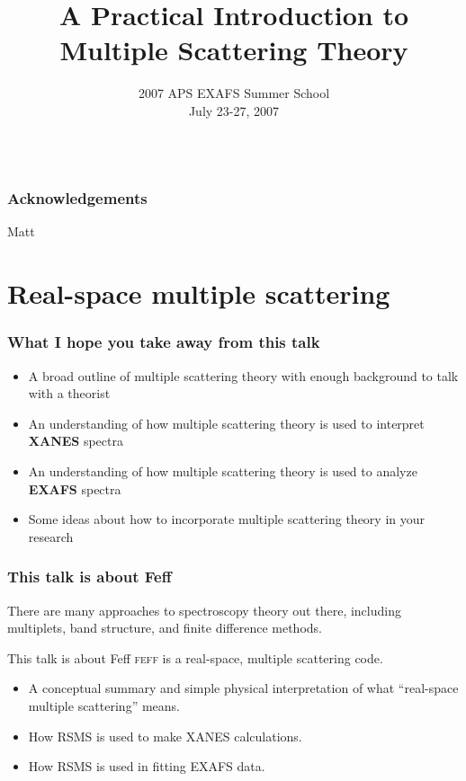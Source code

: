 \documentclass[10pt, xcolor=x11names, compress]{beamer}
\title{A Practical Introduction to Multiple Scattering Theory}
\date[APS EXAFS 07]{2007 APS EXAFS Summer School\\July 23-27, 2007\\~}
\begin{document}
\maketitle

\begin{frame}
  \frametitle{Acknowledgements}
  Matt
\end{frame}

\section{Real-space multiple scattering}

\begin{frame}
  \frametitle{What I hope you take away from this talk}
  \begin{itemize}
  \item A broad outline of multiple scattering theory with enough
    background to talk with a theorist
  \item An understanding of how multiple scattering theory is used to
    interpret \textbf{XANES} spectra
  \item An understanding of how multiple scattering theory is used to
    analyze \textbf{EXAFS} spectra
  \item Some ideas about how to incorporate multiple scattering theory
    in your research
  \end{itemize}
\end{frame}

\begin{frame}
  \frametitle{This talk is about Feff}

  There are many approaches to spectroscopy theory out there,
  including multiplets, band structure, and finite difference methods.

  \bigskip

  \begin{exampleblock}{This talk is about Feff}
    \textsc{feff} is a real-space, multiple scattering code.
  \end{exampleblock}
  
  \bigskip

  \begin{itemize}
  \item A conceptual summary and simple physical interpretation of
    what ``real-space multiple scattering'' means.
  \item How RSMS is used to make XANES calculations.
  \item How RSMS is used in fitting EXAFS data.
  \end{itemize}
\end{frame}
\end{document}
